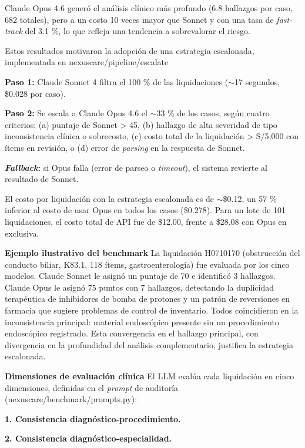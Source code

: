 Claude Opus 4.6 generó el análisis clínico más profundo (6.8 hallazgos por caso, 682 totales), pero a un costo 10 veces mayor que Sonnet y con una tasa de \textit{fast-track} del 3.1 \%, lo que refleja una tendencia a sobrevalorar el riesgo.

Estos resultados motivaron la adopción de una estrategia escalonada, implementada en nexuscare/pipeline/escalate

\textbf{Paso 1:} Claude Sonnet 4 filtra el 100 \% de las liquidaciones ($\sim$17 segundos, \$0.028 por caso).

\textbf{Paso 2:} Se escala a Claude Opus 4.6 el $\sim$33 \% de los casos, según cuatro criterios: (a) puntaje de Sonnet > 45, (b) hallazgo de alta severidad de tipo inconsistencia clínica o sobrecosto, (c) costo total de la liquidación > S/5,000 con ítems en revisión, o (d) error de \textit{parsing} en la respuesta de Sonnet.

\textbf{\textit{Fallback}:} si Opus falla (error de parseo o \textit{timeout}), el sistema revierte al resultado de Sonnet.

El costo por liquidación con la estrategia escalonada es de $\sim$\$0.12, un 57 \% inferior al costo de usar Opus en todos los casos (\$0.278). Para un lote de 101 liquidaciones, el costo total de API fue de \$12.00, frente a \$28.08 con Opus en exclusiva.

\textbf{Ejemplo ilustrativo del benchmark} La liquidación H0710170 (obstrucción del conducto biliar, K83.1, 118 ítems, gastroenterología) fue evaluada por los cinco modelos. Claude Sonnet le asignó un puntaje de 70 e identificó 3 hallazgos. Claude Opus le asignó 75 puntos con 7 hallazgos, detectando la duplicidad terapéutica de inhibidores de bomba de protones y un patrón de reversiones en farmacia que sugiere problemas de control de inventario. Todos coincidieron en la inconsistencia principal: material endoscópico presente sin un procedimiento endoscópico registrado. Esta convergencia en el hallazgo principal, con divergencia en la profundidad del análisis complementario, justifica la estrategia escalonada.

\textbf{Dimensiones de evaluación clínica} El LLM evalúa cada liquidación en cinco dimensiones, definidas en el \textit{prompt} de auditoría (nexuscare/benchmark/prompts.py):

\noindent \textbf{1. Consistencia diagnóstico-procedimiento.}

\noindent \textbf{2. Consistencia diagnóstico-especialidad.}

